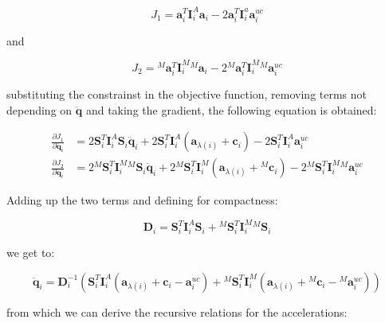 \begin{equation}
    J _1 = \mathbf{a} ^T _i \mathbf{I} ^A _i \mathbf{a} _i - 2\mathbf{a} ^T _i \mathbf{I} ^a _i \mathbf{a} ^{uc} _i
\end{equation}

and

\begin{equation}
    J _2 = {} ^M \mathbf{a} ^T _i \mathbf{I} ^M _i {} ^M \mathbf{a} _i - 2 {} ^M \mathbf{a} ^T _i \mathbf{I} ^M _i {} ^M \mathbf{a} ^{uc} _i
\end{equation}

substituting the constrainst in the objective function, removing terms not depending on $\ddot{\mathbf{q}}$ and taking the gradient, the following equation is obtained:

\begin{align}
    \frac{\partial J _1}{\partial \ddot{\mathbf{q}} _i} & = 2 \mathbf{S} ^T _i \mathbf{I} ^A _i \mathbf{S} _i \ddot{\mathbf{q}} _i + 2 \mathbf{S} ^T _i \mathbf{I} ^A _i (\mathbf{a} _{\lambda (i)} + \mathbf{c} _i) - 2 \mathbf{S} ^T _i \mathbf{I} ^A _i \mathbf{a} ^{uc} _i \nonumber                                        \\
    \frac{\partial J _2}{\partial \ddot{\mathbf{q}} _i} & = 2 {} ^M \mathbf{S} ^T _i \mathbf{I} ^M _i {} ^M \mathbf{S} _i \ddot{\mathbf{q}} _i + 2 {} ^M  \mathbf{S} ^T _i \mathbf{I} ^M _i (\mathbf{a} _{\lambda (i)} + {} ^M  \mathbf{c} _i) - 2 {} ^M \mathbf{S} ^T _i \mathbf{I} ^M _i {} ^M \mathbf{a} ^{uc} _i  \nonumber
\end{align}

Adding up the two terms and defining for compactness:

\begin{equation}
    \mathbf{D} _i = \mathbf{S} ^T _i \mathbf{I} ^A _i \mathbf{S} _i + {} ^M \mathbf{S} ^T _i \mathbf{I} ^M _i {} ^M \mathbf{S} _i
\end{equation}

we get to:

\begin{equation}
    \ddot{\mathbf{q}} _i = \mathbf{D} _i ^{-1} (\mathbf{S} ^T _i \mathbf{I} ^A _i (\mathbf{a} _{\lambda (i)} + \mathbf{c} _i - \mathbf{a} ^{uc} _i) + {} ^M \mathbf{S} ^T _i \mathbf{I} ^M _i ( \mathbf{a} _{\lambda (i)} + {} ^M \mathbf{c} _i - {} ^M \mathbf{a} ^{uc} _i))
\end{equation}

from which we can derive the recursive relations for the accelerations:

